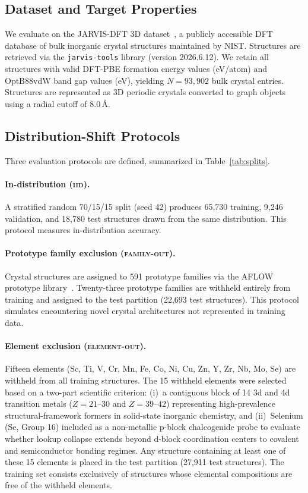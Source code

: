 \documentclass[final,5p,twocolumn,10pt]{elsarticle}
\newcommand{\iid}{\textsc{iid}}
\newcommand{\famout}{\textsc{family-out}}
\newcommand{\elout}{\textsc{element-out}}
\begin{document}
\subsection{Dataset and Target Properties}

We evaluate on the JARVIS-DFT 3D dataset~\cite{choudhary2020joint},
a publicly accessible DFT database of bulk inorganic crystal structures
maintained by NIST. Structures are retrieved via the \texttt{jarvis-tools}
library (version 2026.6.12). We retain all structures with valid
DFT-PBE formation energy values (eV/atom) and OptB88vdW band gap values
(eV), yielding $N = 93{,}902$ bulk crystal entries. Structures are
represented as 3D periodic crystals converted to graph objects using
a radial cutoff of $8.0\,\text{\AA}$.

\subsection{Distribution-Shift Protocols}
\label{sec:splits}

Three evaluation protocols are defined, summarized in Table~\ref{tab:splits}.

\paragraph{In-distribution (\iid{}).}
A stratified random 70/15/15 split (seed 42) produces 65,730 training,
9,246 validation, and 18,780 test structures drawn from the same distribution.
This protocol measures in-distribution accuracy.

\paragraph{Prototype family exclusion (\famout{}).}
Crystal structures are assigned to 591 prototype families via the AFLOW
prototype library~\cite{mehl2017aflow}. Twenty-three prototype families
are withheld entirely from training and assigned to the test partition
(22,693 test structures). This protocol simulates encountering novel
crystal architectures not represented in training data.

\paragraph{Element exclusion (\elout{}).}
Fifteen elements
(Sc, Ti, V, Cr, Mn, Fe, Co, Ni, Cu, Zn, Y, Zr, Nb, Mo, Se)
are withheld from all training structures. The 15 withheld elements were
selected based on a two-part scientific criterion: (i)~a contiguous block of 14 3d
and 4d transition metals ($Z=21\text{--}30$ and $Z=39\text{--}42$) representing
high-prevalence structural-framework formers in solid-state inorganic chemistry, and
(ii)~Selenium (Se, Group 16) included as a non-metallic p-block chalcogenide probe
to evaluate whether lookup collapse extends beyond d-block coordination centers
to covalent and semiconductor bonding regimes. Any structure containing at least
one of these 15 elements is placed in the test partition (27,911 test structures).
The training set consists exclusively of structures whose elemental
compositions are free of the withheld elements.
\end{document}
